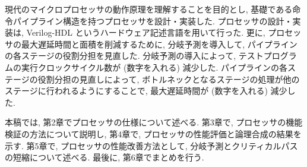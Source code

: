 \documentclass[../main.tex]{subfiles}
\begin{document}
  現代のマイクロプロセッサの動作原理を理解することを目的とし, 
  基礎である命令パイプライン構造を持つプロセッサを設計・実装した.
  プロセッサの設計・実装は, Verilog-HDL というハードウェア記述言語を用いて行った.
  更に, プロセッサの最大遅延時間と面積を削減するために, 
  分岐予測を導入して, パイプラインの各ステージの役割分担を見直した.
  分岐予測の導入によって, テストプログラムの実行クロックサイクル数が (数字を入れる) 減少した.%
  パイプラインの各ステージの役割分担の見直しによって, 
  ボトルネックとなるステージの処理が他のステージに行われるようにすることで, 
  最大遅延時間が (数字を入れる) 減少した. %

  本稿では, 第2章でプロセッサの仕様について述べる.
  第3章で, プロセッサの機能検証の方法について説明し, 
  第4章で, プロセッサの性能評価と論理合成の結果を示す.
  第5章で, プロセッサの性能改善方法として, 分岐予測とクリティカルパスの短縮について述べる.
  最後に, 第6章でまとめを行う.
\end{document}
